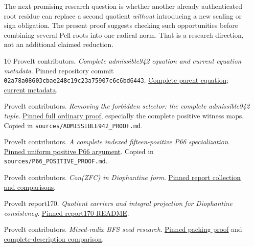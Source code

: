 \documentclass[11pt,letterpaper]{article}
\theoremstyle{definition}
\newcommand{\code}[1]{\texttt{\small #1}}
\newcommand{\repo}{https://github.com/VladimirReshetnikov/ProveIt}
\newcommand{\sourcepin}{02a78a08603cbae248c19c23a75907c6c6bd6443}
\begin{document}
The next promising research question is whether another already
authenticated root residue can replace a second quotient \emph{without}
introducing a new scaling or sign obligation. The present proof suggests
checking such opportunities before combining several Pell roots into
one radical norm. That is a research direction, not an additional
claimed reduction.

\begin{thebibliography}{10}
ProveIt contributors.
\emph{Complete admissible942 equation and current equation metadata}.
Pinned repository commit \texttt{\small 02a78a08603cbae248c19c23a75907c6c6bd6443}.
\href{\repo/blob/\sourcepin/Computability/DiophantineConsistency/equation.tex}
{Complete parent equation};
\href{\repo/blob/\sourcepin/Computability/DiophantineConsistency/CURRENT_EQUATION.json}
{current metadata}.

ProveIt contributors.
\emph{Removing the forbidden selector: the complete admissible942 tuple}.
\href{\repo/blob/\sourcepin/Computability/DiophantineConsistency/research/admissible942-independent/PROOF.md}
{Pinned full ordinary proof}, especially the complete positive witness maps.
Copied in \code{sources/ADMISSIBLE942\_PROOF.md}.

ProveIt contributors.
\emph{A complete indexed fifteen-positive P66 specialization}.
\href{\repo/blob/\sourcepin/Computability/DiophantineConsistency/con-zfc-diophantine-forms/174-start-marker-compositions/compact66/calibration/P66_POSITIVE_PROOF.md}
{Pinned uniform positive P66 argument}.
Copied in \code{sources/P66\_POSITIVE\_PROOF.md}.

ProveIt contributors.
\emph{Con(ZFC) in Diophantine form}.
\href{\repo/blob/\sourcepin/Computability/DiophantineConsistency/con-zfc-diophantine-forms/README.md}
{Pinned report collection and comparisons}.

ProveIt report170.
\emph{Quotient carriers and integral projection for Diophantine consistency}.
\href{\repo/blob/\sourcepin/Computability/DiophantineConsistency/con-zfc-diophantine-forms/170-quotient-carriers/README.md}
{Pinned report170 README}.

ProveIt contributors.
\emph{Mixed-radix BFS seed research}.
\href{\repo/blob/\sourcepin/Computability/DiophantineConsistency/research/mixed-radix-bfs-seed/PROOF.md}
{Pinned packing proof} and
\href{\repo/blob/\sourcepin/Computability/DiophantineConsistency/research/mixed-radix-bfs-seed/README.md}
{complete-description comparison}.


\end{thebibliography}
\end{document}
